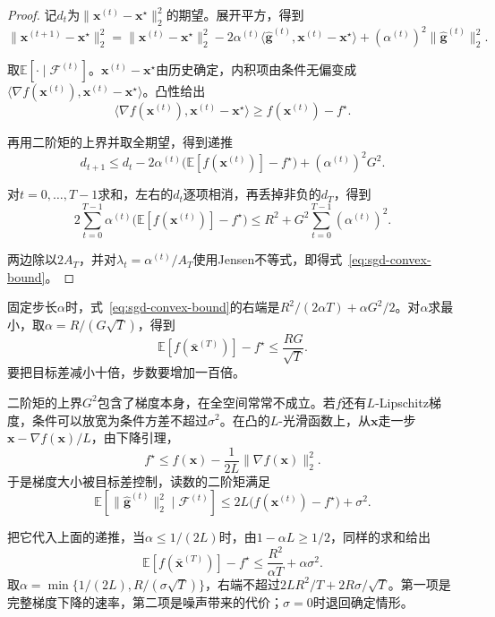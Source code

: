 \begin{proof}
记$d_t$为$\lVert\bm{x}^{(t)}-\bm{x}^\star\rVert_2^2$的期望。展开平方，得到
\[
 \lVert\bm{x}^{(t+1)}-\bm{x}^\star\rVert_2^2=\lVert\bm{x}^{(t)}-\bm{x}^\star\rVert_2^2-2\alpha^{(t)}\langle\hat{\bm{g}}^{(t)},\bm{x}^{(t)}-\bm{x}^\star\rangle+(\alpha^{(t)})^2\lVert\hat{\bm{g}}^{(t)}\rVert_2^2.
\]

取$\mathbb{E}[\cdot\mid\mathcal{F}^{(t)}]$。$\bm{x}^{(t)}-\bm{x}^\star$由历史确定，内积项由条件无偏变成$\langle\nabla f(\bm{x}^{(t)}),\bm{x}^{(t)}-\bm{x}^\star\rangle$。凸性给出
\[
 \langle\nabla f(\bm{x}^{(t)}),\bm{x}^{(t)}-\bm{x}^\star\rangle\geq f(\bm{x}^{(t)})-f^\star.
\]

再用二阶矩的上界并取全期望，得到递推
\[
 d_{t+1}\leq d_t-2\alpha^{(t)}\bigl(\mathbb{E}[f(\bm{x}^{(t)})]-f^\star\bigr)+(\alpha^{(t)})^2G^2.
\]

对$t=0,\ldots,T-1$求和，左右的$d_t$逐项相消，再丢掉非负的$d_T$，得到
\[
 2\sum_{t=0}^{T-1}\alpha^{(t)}\bigl(\mathbb{E}[f(\bm{x}^{(t)})]-f^\star\bigr)\leq R^2+G^2\sum_{t=0}^{T-1}(\alpha^{(t)})^2.
\]

两边除以$2A_T$，并对$\lambda_t=\alpha^{(t)}/A_T$使用Jensen不等式，即得式~\eqref{eq:sgd-convex-bound}。
\end{proof}

固定步长$\alpha$时，式~\eqref{eq:sgd-convex-bound}的右端是$R^2/(2\alpha T)+\alpha G^2/2$。对$\alpha$求最小，取$\alpha=R/(G\sqrt{T})$，得到
\begin{equation}
 \mathbb{E}[f(\bar{\bm{x}}^{(T)})]-f^\star\leq\frac{RG}{\sqrt{T}}.
 \label{eq:sgd-convex-rate}
\end{equation}
要把目标差减小十倍，步数要增加一百倍。

二阶矩的上界$G^2$包含了梯度本身，在全空间常常不成立。若$f$还有$L$-Lipschitz梯度，条件可以放宽为条件方差不超过$\sigma^2$。在凸的$L$-光滑函数上，从$\bm{x}$走一步$\bm{x}-\nabla f(\bm{x})/L$，由下降引理，
\[
 f^\star\leq f(\bm{x})-\frac{1}{2L}\lVert\nabla f(\bm{x})\rVert_2^2.
\]
于是梯度大小被目标差控制，读数的二阶矩满足
\[
 \mathbb{E}[\lVert\hat{\bm{g}}^{(t)}\rVert_2^2\mid\mathcal{F}^{(t)}]\leq2L\bigl(f(\bm{x}^{(t)})-f^\star\bigr)+\sigma^2.
\]

把它代入上面的递推，当$\alpha\leq1/(2L)$时，由$1-\alpha L\geq1/2$，同样的求和给出
\begin{equation}
 \mathbb{E}[f(\bar{\bm{x}}^{(T)})]-f^\star\leq\frac{R^2}{\alpha T}+\alpha\sigma^2.
 \label{eq:sgd-convex-smooth}
\end{equation}
取$\alpha=\min\{1/(2L),R/(\sigma\sqrt{T})\}$，右端不超过$2LR^2/T+2R\sigma/\sqrt{T}$。第一项是完整梯度下降的速率，第二项是噪声带来的代价；$\sigma=0$时退回确定情形。

